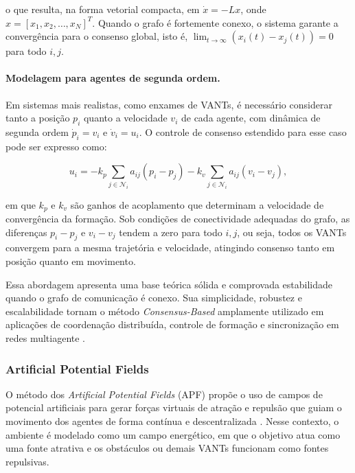 o que resulta, na forma vetorial compacta, em \(\dot{x} = -Lx\), onde \(x = [x_1, x_2, \dots, x_N]^T\). Quando o grafo é fortemente conexo, o sistema garante a convergência para o consenso global, isto é, \(\lim_{t \to \infty} (x_i(t) - x_j(t)) = 0\) para todo \(i,j\).

\paragraph{Modelagem para agentes de segunda ordem.}
Em sistemas mais realistas, como enxames de VANTs, é necessário considerar tanto a posição \(p_i\) quanto a velocidade \(v_i\) de cada agente, com dinâmica de segunda ordem \(\dot{p}_i = v_i\) e \(\dot{v}_i = u_i\). O controle de consenso estendido para esse caso pode ser expresso como:

\begin{equation}
u_i = -k_p \sum_{j \in \mathcal{N}_i} a_{ij}(p_i - p_j) - k_v \sum_{j \in \mathcal{N}_i} a_{ij}(v_i - v_j),
\end{equation}

em que \(k_p\) e \(k_v\) são ganhos de acoplamento que determinam a velocidade de convergência da formação. Sob condições de conectividade adequadas do grafo, as diferenças \(p_i - p_j\) e \(v_i - v_j\) tendem a zero para todo \(i,j\), ou seja, todos os VANTs convergem para a mesma trajetória e velocidade, atingindo consenso tanto em posição quanto em movimento.

Essa abordagem apresenta uma base teórica sólida e comprovada estabilidade quando o grafo de comunicação é conexo. Sua simplicidade, robustez e escalabilidade tornam o método \textit{Consensus-Based} amplamente utilizado em aplicações de coordenação distribuída, controle de formação e sincronização em redes multiagente \citep{olfati2007consensus, ren2008distributed}.


\subsubsection{Artificial Potential Fields}

O método dos \textit{Artificial Potential Fields} (APF) propõe o uso de campos de potencial artificiais para gerar forças virtuais de atração e repulsão que guiam o movimento dos agentes de forma contínua e descentralizada \citep{khatib1986real, bu2024advancement, ouyang2023formation}. Nesse contexto, o ambiente é modelado como um campo energético, em que o objetivo atua como uma fonte atrativa e os obstáculos ou demais VANTs funcionam como fontes repulsivas.

